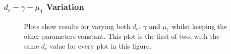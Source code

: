 \subsubsection*{$d_c - \gamma - \mu_1$ Variation}
\begin{figure}[h!]
    \centering
    \caption{Plots show results for varying both $d_c$, $\gamma$ and $\mu_1$ whilst keeping the other parameters constant. This plot is the first of two, with the same $d_c$ value for every plot in this figure.}
    \label{fig:prolif_dc_gamma_mu_1_variation_1}
\end{figure}

